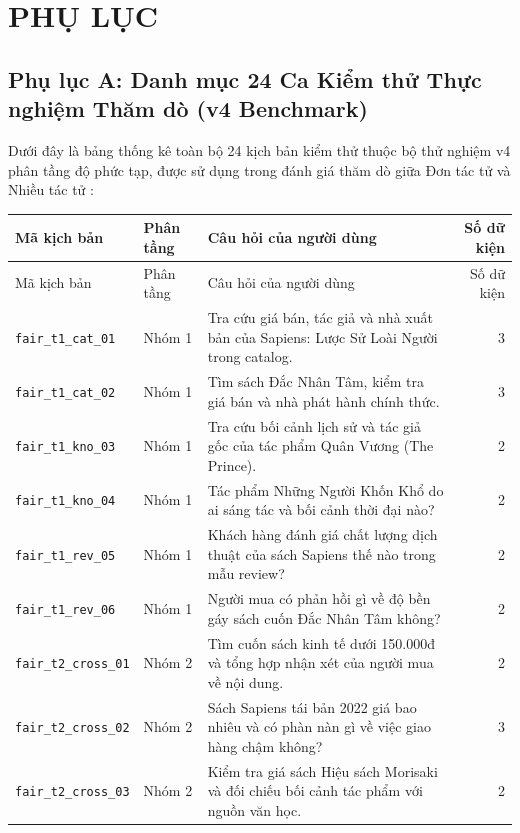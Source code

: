 \clearpage
\appendix
\section*{PHỤ LỤC}

\subsection*{Phụ lục A: Danh mục 24 Ca Kiểm thử Thực nghiệm Thăm dò (v4 Benchmark)}

Dưới đây là bảng thống kê toàn bộ 24 kịch bản kiểm thử thuộc bộ thử nghiệm v4 phân tầng độ phức tạp, được sử dụng trong đánh giá thăm dò giữa Đơn tác tử và Nhiều tác tử :

\begin{longtable}{P{28mm}P{16mm}P{86mm}r}\toprule
Mã kịch bản & Phân tầng & Câu hỏi của người dùng & Số dữ kiện\\\midrule
\endfirsthead
\toprule
Mã kịch bản & Phân tầng & Câu hỏi của người dùng & Số dữ kiện\\\midrule
\endhead
\bottomrule
\endfoot
\texttt{fair\_t1\_cat\_01} & Nhóm 1 & Tra cứu giá bán, tác giả và nhà xuất bản của Sapiens: Lược Sử Loài Người trong catalog. & 3\\
\texttt{fair\_t1\_cat\_02} & Nhóm 1 & Tìm sách Đắc Nhân Tâm, kiểm tra giá bán và nhà phát hành chính thức. & 3\\
\texttt{fair\_t1\_kno\_03} & Nhóm 1 & Tra cứu bối cảnh lịch sử và tác giả gốc của tác phẩm Quân Vương (The Prince). & 2\\
\texttt{fair\_t1\_kno\_04} & Nhóm 1 & Tác phẩm Những Người Khốn Khổ do ai sáng tác và bối cảnh thời đại nào? & 2\\
\texttt{fair\_t1\_rev\_05} & Nhóm 1 & Khách hàng đánh giá chất lượng dịch thuật của sách Sapiens thế nào trong mẫu review? & 2\\
\texttt{fair\_t1\_rev\_06} & Nhóm 1 & Người mua có phản hồi gì về độ bền gáy sách cuốn Đắc Nhân Tâm không? & 2\\
\texttt{fair\_t2\_cross\_01} & Nhóm 2 & Tìm cuốn sách kinh tế dưới 150.000đ và tổng hợp nhận xét của người mua về nội dung. & 2\\
\texttt{fair\_t2\_cross\_02} & Nhóm 2 & Sách Sapiens tái bản 2022 giá bao nhiêu và có phàn nàn gì về việc giao hàng chậm không? & 3\\
\texttt{fair\_t2\_cross\_03} & Nhóm 2 & Kiểm tra giá sách Hiệu sách Morisaki và đối chiếu bối cảnh tác phẩm với nguồn văn học. & 2\\

\end{longtable}
